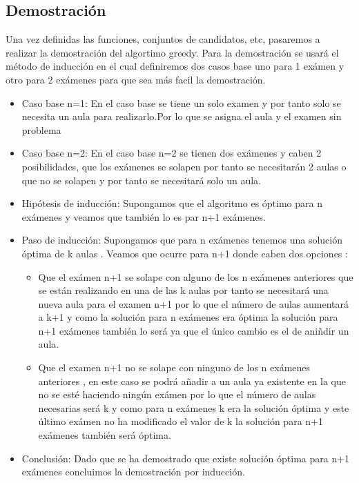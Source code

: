 \documentclass[11pt,openany]{book}
\begin{document}
\subsection{Demostración }
Una vez definidas las funciones, conjuntos de candidatos, etc,  pasaremos a realizar la demostración del algortimo greedy.
Para la demostración se usará el método de inducción en el cual definiremos dos casos base uno para 1 exámen y otro para 2 
exámenes para que sea más facil la  demostración.

\begin{itemize}
      \item Caso base n=1:
            En el caso base se tiene un solo examen y por tanto solo se necesita un aula para realizarlo.Por lo que se 
            asigna el aula y el examen sin problema
      \item Caso base n=2:
            En el caso base n=2 se tienen dos exámenes y caben 2 posibilidades, que los exámenes se solapen por tanto 
            se necesitarán 2 aulas o que no se solapen y por tanto se necesitará solo un aula.

      \item Hipótesis de inducción:
            Supongamos que el algoritmo es óptimo para n exámenes y veamos que también lo es par n+1 exámenes.
      \item Paso de inducción:
            Supongamos que para n exámenes tenemos una solución óptima de k aulas . Veamos que ocurre para n+1 
            donde caben dos opciones :
            \begin{itemize}
                  \item Que el exámen n+1 se solape con alguno de los n exámenes anteriores  que se están realizando en una 
                        de las k aulas por tanto se necesitará una nueva aula para el examen n+1 por lo que el número de aulas aumentará a 
                        k+1 y como la solución para n exámenes era óptima la solución para n+1 exámenes también lo será ya que el único cambio
                        es el de aniñdir un aula. 
                  \item Que el examen n+1 no se solape con ninguno de los n exámenes anteriores , en este caso se podrá 
                        añadir a un aula ya existente en la que no se esté haciendo ningún exámen 
                        por lo que el número de aulas necesarias será k y como para n exámenes k era la solución óptima y este último 
                        exámen no ha modificado el valor de k la solución para n+1 exámenes también será óptima.
            \end{itemize}
      \item Conclusión:
            Dado que se ha demostrado que existe solución óptima para n+1 exámenes concluimos 
            la demostración por inducción.

\end{itemize}
\end{document}
